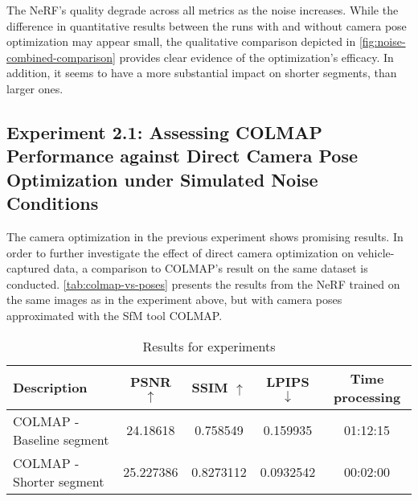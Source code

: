 %
%


The NeRF's quality degrade across all metrics as the noise increases. While the difference in quantitative results between the runs with and without camera pose optimization may appear small, the qualitative comparison depicted in \autoref{fig:noise-combined-comparison} provides clear evidence of the optimization's efficacy. In addition, it seems to have a more substantial impact on shorter segments, than larger ones.

\begin{comment}
Information about GNSS-error
https://junipersys.com/support/article/6614#:~:text=Just%
\end{comment}



\subsection{Experiment 2.1: Assessing COLMAP Performance against Direct Camera Pose Optimization under Simulated Noise Conditions}

The camera optimization in the previous experiment shows promising results. In order to further investigate the effect of direct camera optimization on vehicle-captured data, a comparison to COLMAP's result on the same dataset is conducted. \autoref{tab:colmap-vs-poses} presents the results from the NeRF trained on the same images as in the experiment above, but with camera poses approximated with the SfM tool COLMAP.

\begin{table}[ht]
\centering
\setlength{\tabcolsep}{6pt}
\renewcommand{\arraystretch}{1.5}
\begin{tabular}{l | C{2.2} C{1.3} C{1.3} c}
\hline
\textbf{Description} & \textbf{PSNR $\uparrow$} & \textbf{SSIM $\uparrow$} & \textbf{LPIPS $\downarrow$} & \textbf{Time processing} \\
\hline
COLMAP - Baseline segment   & 24.18618  & 0.758549  & 0.159935  & 01:12:15 \\
COLMAP - Shorter segment    & 25.227386 & 0.8273112 & 0.0932542 & 00:02:00 \\
\hline
\end{tabular}
\caption{Results for experiments}
\label{tab:colmap-vs-poses}
\end{table}

